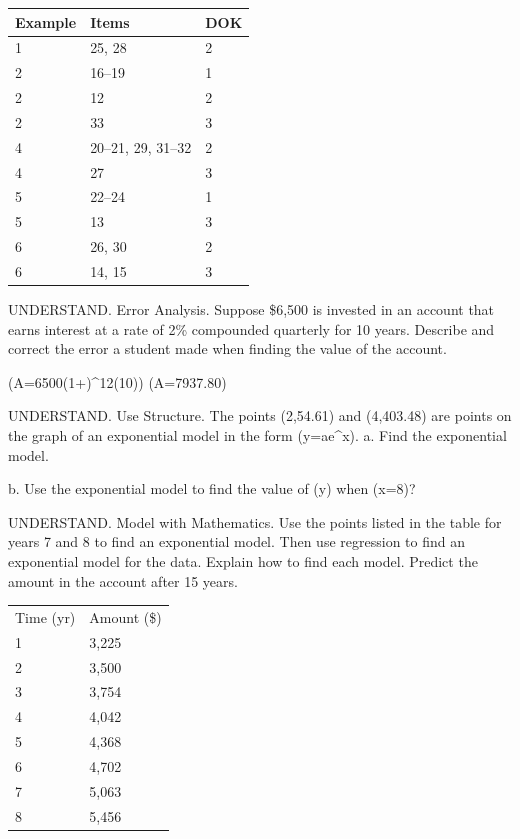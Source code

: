 \documentclass{article}
\newenvironment{item-analysis}{}{}      %
\newenvironment{practice}[2]{}{}        %
\newcommand{\answer}[1]{}               %
\newcommand{\te}[1]{}                   %
\begin{document}
\begin{item-analysis}
\begin{tabular}{lll}
\toprule
Example & Items & DOK \\
\midrule
1 & 25, 28 & 2 \\
2 & 16--19 & 1 \\
2 & 12 & 2 \\
2 & 33 & 3 \\
4 & 20--21, 29, 31--32 & 2 \\
4 & 27 & 3 \\
5 & 22--24 & 1 \\
5 & 13 & 3 \\
6 & 26, 30 & 2 \\
6 & 14, 15 & 3 \\
\bottomrule
\end{tabular}
\end{item-analysis}
\begin{practice}{12}{2}
UNDERSTAND. Error Analysis. Suppose \$6,500 is invested in an account that earns interest at a rate of 2\% compounded quarterly for 10 years. Describe and correct the error a student made when finding the value of the account.
\te{Student work, marked with a red X:}
(A=6500(1+)^{12(10)})
(A=7937.80)
\answer{The student compounded the interest monthly instead of quarterly. (A=\$7,935.16).}
\end{practice}
\begin{practice}{13}{3}
UNDERSTAND. Use Structure. The points (2,54.61) and (4,403.48) are points on the graph of an exponential model in the form (y=a\cdot e^x).
a. Find the exponential model.
\answer{a. Substitute one of the given points into the model to find the value of (a); (y=7.39e^x).}
b. Use the exponential model to find the value of (y) when (x=8)?
\answer{b. Substitute 8 into the model to find (y=22,029).}
\end{practice}
\begin{practice}{14}{3}
UNDERSTAND. Model with Mathematics. Use the points listed in the table for years 7 and 8 to find an exponential model. Then use regression to find an exponential model for the data. Explain how to find each model. Predict the amount in the account after 15 years.
\begin{tabular}{ll}
Time (yr) & Amount (\$) \\
1 & 3,225 \\
2 & 3,500 \\
3 & 3,754 \\
4 & 4,042 \\
5 & 4,368 \\
6 & 4,702 \\
7 & 5,063 \\
8 & 5,456 \\
\end{tabular}
\answer{(y=2,954(1.08)^x); (y=3,002(1.078)^x); To find the exponential model using data points, find the growth rate between two consecutive data points and that growth rate and one of the points to find the initial value. To find the model using a calculator, enter the data and find the exponential regression. \$9,262.}
\end{practice}
\end{document}
